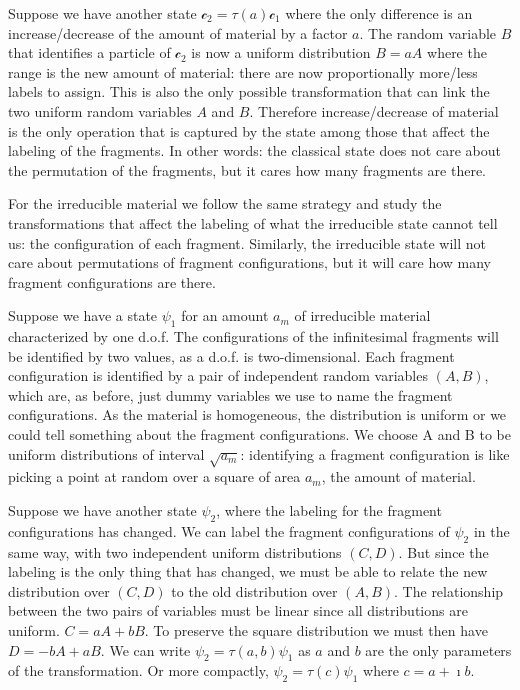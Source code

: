 \documentclass[smallextended]{svjour3}
\numberwithin{equation}{section}
\theoremstyle{definition}
\begin{document}
Suppose we have another state $\mathcal{c}_2 = \tau(a) \mathcal{c}_1$ where the only difference is an increase/decrease of the amount of material by a factor $a$. The random variable $B$ that identifies a particle of $\mathcal{c}_2$ is now a uniform distribution $B=aA$ where the range is the new amount of material: there are now proportionally more/less labels to assign. This is also the only possible transformation that can link the two uniform random variables $A$ and $B$. Therefore increase/decrease of material is the only operation that is captured by the state among those that affect the labeling of the fragments. In other words: the classical state does not care about the permutation of the fragments, but it cares how many fragments are there.

For the irreducible material we follow the same strategy and study the transformations that affect the labeling of what the irreducible state cannot tell us: the configuration of each fragment. Similarly, the irreducible state will not care about permutations of fragment configurations, but it will care how many fragment configurations are there.

Suppose we have a state $\psi_1$ for an amount $a_m$ of irreducible material characterized by one d.o.f. The configurations of the infinitesimal fragments will be identified by two values, as a d.o.f. is two-dimensional. Each fragment configuration is identified by a pair of independent random variables $(A, B)$, which are, as before, just dummy variables we use to name the fragment configurations. As the material is homogeneous, the distribution is uniform or we could tell something about the fragment configurations. We choose A and B to be uniform distributions of interval $\sqrt{a_m}$: identifying a fragment configuration is like picking a point at random over a square of area $a_m$, the amount of material.

Suppose we have another state $\psi_2$, where the labeling for the fragment configurations has changed. We can label the fragment configurations of $\psi_2$ in the same way, with two independent uniform distributions $(C, D)$. But since the labeling is the only thing that has changed, we must be able to relate the new distribution over $(C,D)$ to the old distribution over $(A,B)$. The relationship between the two pairs of variables must be linear since all distributions are uniform. $C=aA+bB$. To preserve the square distribution we must then have $D= -bA + aB$. We can write $\psi_2 = \tau(a,b) \psi_1$ as $a$ and $b$ are the only parameters of the transformation. Or more compactly, $\psi_2 = \tau(c) \psi_1$ where $c=a+\imath b$.
\end{document}
